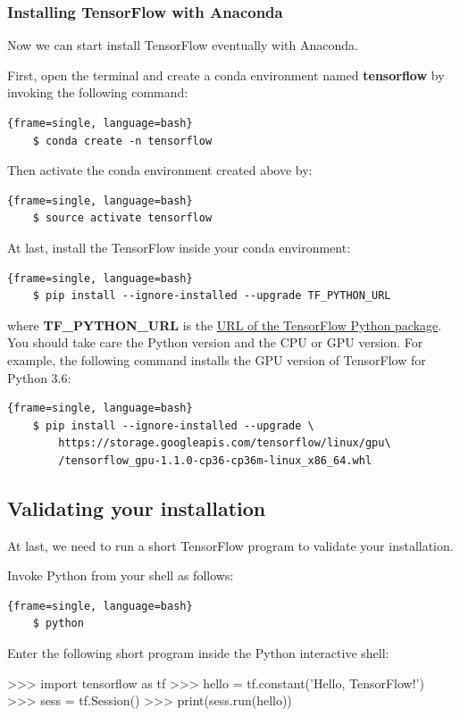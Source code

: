 \documentclass[12pt,letterpaper]{article}
\begin{document}
	\subsubsection{Installing TensorFlow with Anaconda}
	Now we can start install TensorFlow eventually with Anaconda. \par
	First, open the terminal and create a conda environment named \textbf{tensorflow} by invoking the following command:
	\begin{lstlisting}{frame=single, language=bash}
	$ conda create -n tensorflow
	\end{lstlisting}	
	
	Then activate the conda environment created above by:
	\begin{lstlisting}{frame=single, language=bash}
	$ source activate tensorflow
	\end{lstlisting}
	
	At last, install the TensorFlow inside your conda environment:
	\begin{lstlisting}{frame=single, language=bash}
	$ pip install --ignore-installed --upgrade TF_PYTHON_URL
	\end{lstlisting}
	
	where \textbf{TF\_PYTHON\_URL} is the \href{https://www.tensorflow.org/install/install_linux#the_url_of_the_tensorflow_python_package}{URL of the TensorFlow Python package}. You should take care the Python version and the CPU or GPU version. For example, the following command installs the GPU version of TensorFlow for Python 3.6:
	
	\begin{lstlisting}{frame=single, language=bash}
	$ pip install --ignore-installed --upgrade \
		https://storage.googleapis.com/tensorflow/linux/gpu\
		/tensorflow_gpu-1.1.0-cp36-cp36m-linux_x86_64.whl
	\end{lstlisting}
	
	\subsection{Validating your installation}
	At last, we need to run a short TensorFlow program to validate your installation. \par
	Invoke Python from your shell as follows:
	\begin{lstlisting}{frame=single, language=bash}
	$ python
	\end{lstlisting}
	
	Enter the following short program inside the Python interactive shell: \par
	\begin{python}
		>>> import tensorflow as tf
		>>> hello = tf.constant('Hello, TensorFlow!')
		>>> sess = tf.Session()
		>>> print(sess.run(hello))
		\end{python}
	
\end{document}
